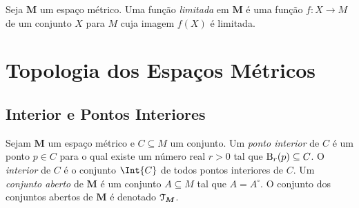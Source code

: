\begin{defi}
Seja $\bm M$ um espaço métrico. Uma função \emph{limitada} em $\bm M$ é uma função $f\colon X \to M$ de um conjunto $X$ para $M$ cuja imagem $f(X)$ é limitada.
\end{defi}

\section{Topologia dos Espaços Métricos}

\subsection{Interior e Pontos Interiores}

\begin{defi}
Sejam $\bm M$ um espaço métrico e $C \subseteq M$ um conjunto. Um \emph{ponto interior} de $C$ é um ponto $p \in C$ para o qual existe um número real $r > 0$ tal que $\mathrm{B}_r(p) \subseteq C$. O \emph{interior} de $C$ é o conjunto $\Int{C}$ de todos pontos interiores de $C$. Um \emph{conjunto aberto} de $\bm M$ é um conjunto $A \subseteq M$ tal que $A = A^\circ$. O conjunto dos conjuntos abertos de $\bm M$ é denotado $\mathcal{T}_{\bm M}$.
\end{defi}

